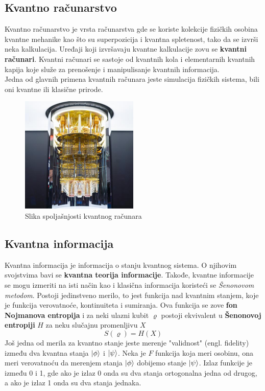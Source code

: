 \documentclass[12pt, letterpaper, oneside]{article}
\begin{document}
\subsection{Kvantno računarstvo}
Kvantno računarstvo je vrsta računarstva gde se koriste kolekcije fizičkih osobina kvantne mehanike kao što su superpozicija i kvantna spletenost,
tako da se izvrši neka kalkulacija. Uređaji koji izvršavaju kvantne kalkulacije zovu se \textbf{kvantni računari}.
Kvantni računari se sastoje od kvantnih kola i elementarnih kvantnih kapija koje služe za prenošenje i manipulisanje kvantnih informacija.
\cite{nielsen_chuang_10th} \\
Jedna od glavnih primena kvantnih računara jeste simulacija fizičkih sistema, bili oni kvantne ili klasične prirode.
\begin{figure}[ht]
    \centering
    \includegraphics[width=0.5\textwidth]{files/media_sizes_full_QC-stack-fig-2.jpg}
    \caption{Slika spoljašnjosti kvantnog računara \cite{QuantumComputerImage}}
\end{figure}

\subsection{Kvantna informacija}
Kvantna informacija je informacija o stanju kvantnog sistema. O njihovim svojstvima bavi se \textbf{kvantna teorija informacije}.
Takođe, kvantne informacije se mogu izmeriti na isti način kao i klasična informacija koristeći se \textit{Šenonovom metodom}. 
Postoji jedinstveno merilo, to jest funkcija nad kvantnim stanjem, koje je funkcija verovatnoće, kontinuiteta i sumiranja.\cite{vlatko_v}
Ova funkcija se zove \textbf{fon Nojmanova entropija} i za neki ulazni kubit $\varrho$ postoji ekvivalent u \textbf{Šenonovoj entropiji} $H$
za neku slučajnu promenljivu $X$
\[
    S(\varrho) = H(X)
\]
Još jedna od merila za kvantno stanje jeste merenje "validnost" (engl. fidelity) između dva kvantna stanja $\ket{\phi}$ i $\ket{\psi}$.
Neka je $F$ funkcija koja meri osobinu, ona meri verovatnoću da merenjem stanja $\ket{\phi}$ dobijemo stanje $\ket{\psi}$.
Izlaz funkcije je između 0 i 1, gde ako je izlaz 0 onda su dva stanja ortogonalna jedna od drugog, a ako je izlaz 1 onda su dva stanja jednaka.\cite{vlatko_v}
\end{document}
